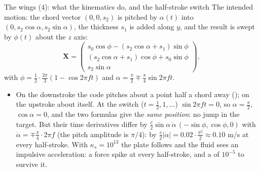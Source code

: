 \documentclass[aspectratio=169,11pt]{beamer}
\begin{document}
\begin{frame}{The wings (4): what the kinematics do, and the half-stroke switch}
\label{fr:kinematics}
\footnotesize
The intended motion: the chord vector $(0, 0, s_2)$ is pitched by $\alpha(t)$ into $(0, s_2\cos\alpha, s_2\sin\alpha)$, the thickness $s_1$ is added along $y$, and the result is swept by $\phi(t)$ about the $z$ axis:
\[ \mathbf{X} = \begin{pmatrix} s_0\cos\phi - (s_2\cos\alpha + s_1)\sin\phi \\ (s_2\cos\alpha + s_1)\cos\phi + s_0\sin\phi \\ s_2\sin\alpha \end{pmatrix}, \]
with $\phi = \tfrac12\cdot\tfrac{2\pi}{3}(1 - \cos 2\pi f t)$ and $\alpha = \tfrac{\pi}{2} \mp \tfrac{\pi}{4}\sin 2\pi f t$.
\begin{itemize}
  \item {} On the downstroke the code pitches about a point half a chord away (); on the upstroke about  itself. At the switch ($t = \tfrac12, 1, \ldots$) $\sin 2\pi ft = 0$, so $\alpha = \tfrac{\pi}{2}$, $\cos\alpha = 0$, and the two formulas give the \emph{same position}: no jump in the target. But their time derivatives differ by $\tfrac{c}{2}\sin\alpha\,\dot\alpha\,(-\sin\phi, \cos\phi, 0)$ with $\dot\alpha = \mp\tfrac{\pi}{4}\cdot 2\pi f$ (the pitch amplitude is $\pi/4$):  by $\tfrac{c}{2}|\dot\alpha| = 0.02 \cdot \tfrac{\pi^2}{2} \approx 0.10$ m/s at every half-stroke. With $\kappa_s = 10^{13}$ the plate follows and the fluid sees an impulsive acceleration: a force spike at every half-stroke, and a  of $10^{-5}$ to survive it.
\end{itemize}
\end{frame}
\end{document}
